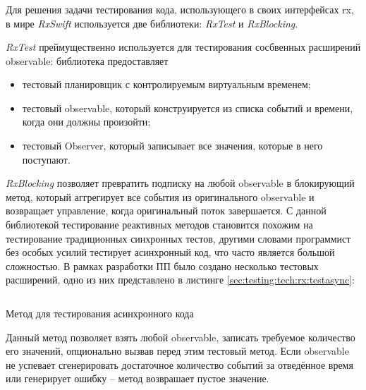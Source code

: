 \subsubsection{}
\label{sec:testing:tech:rx}

Для решения задачи тестирования кода, использующего в своих интерфейсах \gls{rx}, в мире \textit{RxSwift} используется две библиотеки: \textit{RxTest} и \textit{RxBlocking}.

\textit{RxTest} преймущественно используется для тестирования сосбвенных расширений \gls{observable}: библиотека предоставляет

\begin{itemize}
	\item тестовый планировщик с контролируемым виртуальным временем;
	\item тестовый \gls{observable}, который конструируется из списка событий и времени, когда они должны произойти;
	\item тестовый Observer, который записывает все значения, которые в него поступают.
\end{itemize}

\textit{RxBlocking} позволяет превратить подписку на любой \gls{observable} в блокирующий метод, который аггрегирует все события из оригинального \gls{observable} и возвращает управление, когда оригинальный поток завершается. С данной библиотекой тестирование реактивных методов становится похожим на тестирование традиционных синхронных тестов, другими словами программист без особых усилий тестирует асинхронный код, что часто является большой сложностью. В рамках разработки ПП было создано несколько тестовых расширений, одно из них представлено в листинге \ref{sec:testing:tech:rx:testasync}:

\begin{code}[h!]
  \inputminted{swift}{inc/src/testasync.swift}
   \caption{Метод для тестирования асинхронного кода}
   \label{sec:testing:tech:rx:testasync}
\end{code}

Данный метод позволяет взять любой \gls{observable}, записать требуемое количество его значений, опционально вызвав перед этим тестовый метод. Если \gls{observable} не успевает сгенерировать достаточное количество событий за отведённое время или генерирует ошибку -- метод возврашает пустое значение.